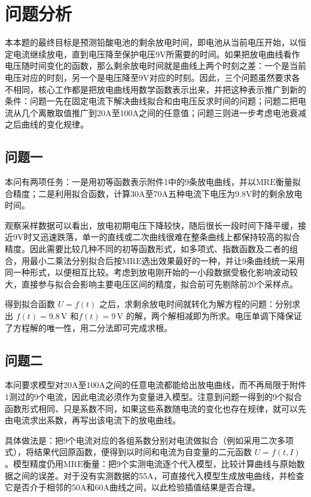 \documentclass[withoutpreface,bwprint]{cumcmthesis} %
\begin{document}
\section{问题分析}
本本题的最终目标是预测铅酸电池的剩余放电时间，即电池从当前电压开始，以恒定电流继续放电，直到电压降至保护电压9V所需要的时间。如果把放电曲线看作电压随时间变化的函数，那么剩余放电时间就是曲线上两个时刻之差：一个是当前电压对应的时刻，另一个是电压降至9V对应的时刻。因此，三个问题虽然要求各不相同，核心工作都是把放电曲线用数学函数表示出来，并把这种表示推广到新的条件：问题一先在固定电流下解决曲线拟合和由电压反求时间的问题；问题二把电流从几个离散取值推广到20A至100A之间的任意值；问题三则进一步考虑电池衰减之后曲线的变化规律。

\subsection{问题一}
本问有两项任务：一是用初等函数表示附件1中的9条放电曲线，并以$\mathrm{MRE}$衡量拟合精度；二是利用拟合函数，计算30A至70A五种电流下电压为9.8V时的剩余放电时间。

观察采样数据可以看出，放电初期电压下降较快，随后很长一段时间下降平缓，接近9V时又迅速跌落，单一的直线或二次曲线很难在整条曲线上都保持较高的拟合精度。因此需要比较几种不同的初等函数形式，如多项式、指数函数及二者的组合，用最小二乘法分别拟合后按$\mathrm{MRE}$选出效果最好的一种，并让9条曲线统一采用同一种形式，以便相互比较。考虑到放电刚开始的一小段数据受极化影响波动较大，直接参与拟合会影响主要电压区间的精度，拟合前可先剔除前20个采样点。

得到拟合函数 $U=f(t)$ 之后，求剩余放电时间就转化为解方程的问题：分别求出 $f(t)=9.8\,\text{V}$ 和$f(t)=9\,\text{V}$ 的解，两个解相减即为所求。电压单调下降保证了方程解的唯一性，用二分法即可完成求根。

\subsection{问题二}
本问要求模型对20A至100A之间的任意电流都能给出放电曲线，而不再局限于附件1测过的9个电流，因此电流必须作为变量进入模型。注意到问题一得到的9个拟合函数形式相同、只是系数不同，如果这些系数随电流的变化也存在规律，就可以先由电流求出系数，再写出该电流下的放电曲线。

具体做法是：把9个电流对应的各组系数分别对电流做拟合（例如采用二次多项式），将结果代回原函数，便得到以时间和电流为自变量的二元函数 $U=f(t,I)$。模型精度仍用$\mathrm{MRE}$衡量：把9个实测电流逐个代入模型，比较计算曲线与原始数据之间的误差。对于没有实测数据的55A，可直接代入模型生成放电曲线，并检查它是否介于相邻的50A和60A曲线之间，以此检验插值结果是否合理。
\end{document}
